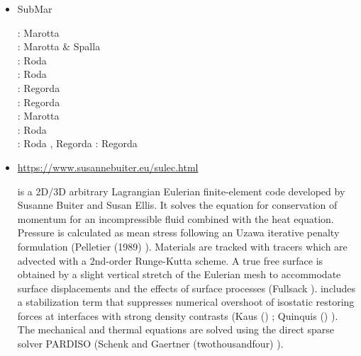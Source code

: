 \begin{itemize}
\item {\codefont SubMar} 

\begin{scriptsize}
\twothousandsix: Marotta \etal \cite{masr06}\\
\twothousandseven: Marotta \& Spalla \cite{masp07}\\
\twothousandten: Roda \etal \cite{roms10}\\
\twothousandtwelve: Roda \etal \cite{rosm12}\\
\twothousandthirteen: Regorda \etal \cite{rems13}\\
\twothousandseventeen: Regorda \etal \cite{rerm17}\\
\twothousandeighteen: Marotta \etal \cite{marc18}\\
\twothousandnineteen: Roda \etal \cite{rors19}\\
\twothousandtwenty: Roda \etal \cite{rozr20}, Regorda \etal \cite{relr20}
\twothousandtwentyone: Regorda \etal \cite{resr21}
\end{scriptsize}


\item \sulec {}

\url{https://www.susannebuiter.eu/sulec.html}

\sulec is a 2D/3D arbitrary Lagrangian Eulerian finite-element 
code developed by Susanne Buiter and Susan Ellis. 
It solves the equation for conservation of momentum for an incompressible fluid combined with 
the heat equation. Pressure is calculated as mean stress following an Uzawa iterative penalty 
formulation (Pelletier \etal (1989) \cite{pefc89}). 
Materials are tracked with tracers which are advected with a 2nd-order Runge-Kutta scheme. 
A true free surface is obtained by a slight vertical stretch of the Eulerian mesh to 
accommodate surface displacements and the effects of surface processes (Fullsack \nineteenninetyfive \cite{full95}). 
\sulec includes a stabilization term that suppresses numerical overshoot of isostatic restoring forces 
at interfaces with strong density contrasts (Kaus \etal (\twothousandten) \cite{kamm10}; 
Quinquis \etal (\twothousandeleven) \cite{qube11}). The mechanical and thermal equations are solved using 
the direct sparse solver PARDISO (Schenk and Gaertner (twothousandfour) \cite{scga04}).


\end{itemize}
